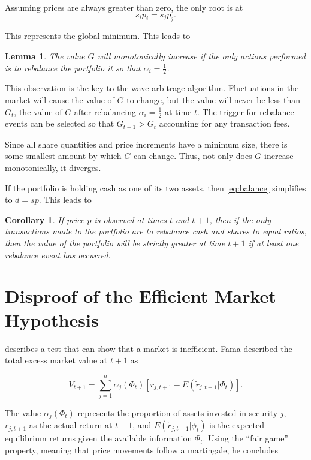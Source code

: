 \documentclass{article}
\newtheorem{corollary}{Corollary}
\newtheorem{lemma}{Lemma}
\begin{document}
Assuming prices are always greater than zero, the only root is at
\begin{equation}
\label{eq:balance}
  s_i p_i = s_j p_j .
\end{equation}

This represents the global minimum. This leads to

\begin{lemma}
\label{lemma}
  The value $G$ will monotonically increase if the only actions performed is to
  rebalance the portfolio it so that $\alpha_i = \frac{1}{2}$.
\end{lemma}

This observation is the key to the wave arbitrage algorithm. Fluctuations in the
market will cause the value of $G$ to change, but the value will never be less
than $G_t$, the value of $G$ after rebalancing $\alpha_i = \frac{1}{2}$ at
time $t$. The trigger for rebalance events can be selected so that
$G_{t+1} > G_t$ accounting for any transaction fees.

Since all share quantities and price increments have a minimum size, there is
some smallest amount by which $G$ can change. Thus, not only does $G$ increase
monotonically, it diverges.

If the portfolio is holding cash as one of its two assets, then
\ref{eq:balance} simplifies to $d = s p$. This leads to

\begin{corollary}
  If price $p$ is observed at times $t$ and $t+1$, then if the only
  transactions made to the portfolio are to rebalance cash and shares to equal
  ratios, then the value of the portfolio will be strictly greater at time
  $t + 1$ if at least one rebalance event has occurred.
\end{corollary}

\section{Disproof of the Efficient Market Hypothesis}

\citet{fama1970} describes a test that can show that a market is
inefficient. Fama described the total excess market value at $t+1$ as

\begin{equation}
  V_{t+1}
    = \sum_{j=1}^n \alpha_j (\Phi_t) [ r_{j,t+1} - E(\tilde{r}_{j,t+1} | \Phi_t)].
\end{equation}

The value $\alpha_j (\Phi_t)$ represents the proportion of assets invested in
security $j$, $r_{j,t+1}$ as the actual return at $t+1$, and
$E(\tilde{r}_{j,t+1} | \phi_t)$ is the expected equilibrium returns given the
available information $\Phi_t$. Using the ``fair game'' property, meaning that price movements follow a martingale, he concludes
\end{document}
